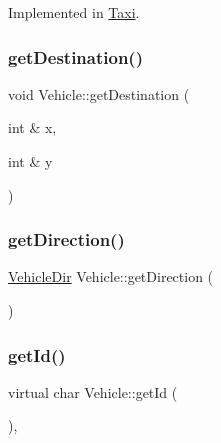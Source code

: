 Implemented in \hyperlink{class_taxi_aa746995561a978caeaa496b7350056be}{Taxi}.

\hypertarget{class_vehicle_a120147fedf77a556438bf2473cea6f5d}{}\label{class_vehicle_a120147fedf77a556438bf2473cea6f5d} 
\subsubsection{\texorpdfstring{get\+Destination()}{getDestination()}}
{\footnotesize\ttfamily void Vehicle\+::get\+Destination (\begin{DoxyParamCaption}\item[{int \&}]{x,  }\item[{int \&}]{y }\end{DoxyParamCaption})\hspace{0.3cm}{\ttfamily [inline]}}

\hypertarget{class_vehicle_ace83a5a3294d0486c7afc21485f83997}{}\label{class_vehicle_ace83a5a3294d0486c7afc21485f83997} 
\subsubsection{\texorpdfstring{get\+Direction()}{getDirection()}}
{\footnotesize\ttfamily \hyperlink{vehicle_8h_ab81942edaa6e6c3f12551c3d0e511b85}{Vehicle\+Dir} Vehicle\+::get\+Direction (\begin{DoxyParamCaption}{ }\end{DoxyParamCaption})\hspace{0.3cm}{\ttfamily [inline]}}

\hypertarget{class_vehicle_a2233c46c45ad1efd5a1e190716592f16}{}\label{class_vehicle_a2233c46c45ad1efd5a1e190716592f16} 
\subsubsection{\texorpdfstring{get\+Id()}{getId()}}
{\footnotesize\ttfamily virtual char Vehicle\+::get\+Id (\begin{DoxyParamCaption}{ }\end{DoxyParamCaption})\hspace{0.3cm}{\ttfamily [inline]}, {\ttfamily [virtual]}}



